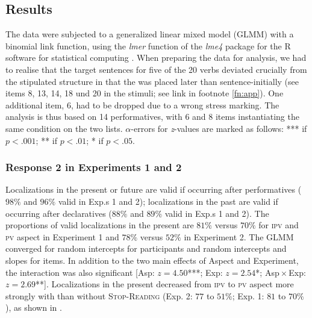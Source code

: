 \documentclass[output=paper,colorlinks,citecolor=brown,newtxmath,hidelinks]{langscibook}
\begin{document}
\subsection{Results}

The data were subjected to a generalized linear mixed model (GLMM) with a binomial link function, using the \textit{lmer} function of the \textit{lme4} package \citep{Bates2015} for the R software for statistical computing \citep{team2014r}.
When preparing the data for analysis, we had to realise that the  target sentences for five of the 20 verbs deviated crucially from the stipulated structure in that the  was placed later than sentence-initially (see items 8, 13, 14, 18 und 20 in the stimuli; see link in footnote \ref{fn:app}). One additional item, 6, had to be dropped due to a wrong stress marking. The analysis is thus based on 14 performatives, with 6 and 8 items instantiating the same condition on the two lists. $\alpha$-errors for \textit{z}-values are marked as follows: \textup{***} if $p<.001$; \textup{**} if $p<.01$; \textup{*} if $p < .05$.

\subsubsection{Response 2 in Experiments 1 and 2}
Localizations in the present or future are valid if occurring after performatives ($98\%$ and $96\%$ valid in Exp.s 1 and 2); localizations in the past are valid if occurring after declaratives ($88\%$ and $89\%$ valid in Exp.s 1 and 2). The proportions of valid localizations in the present are $81\%$ versus $70\%$ for \textsc{ipv} and \textsc{pv} aspect in Experiment 1 and $78\%$ versus $52\%$ in Experiment 2. The GLMM converged for random intercepts for participants and random intercepts and slopes for items. In addition to the two main effects of Aspect and Experiment, the interaction was also significant [Asp: $z=4.50$\textup{***}; Exp: $z=2.54$\textup{*}; Asp${}\times{}$Exp: $z=2.69$\textup{**}]. Localizations in the present decreased from \textsc{ipv} to \textsc{pv} aspect more strongly with than without \textsc{Stop-Reading} (Exp. 2: $77$ to $51\%$; Exp. 1: $81$ to $70\%$), as shown in .
\end{document}
